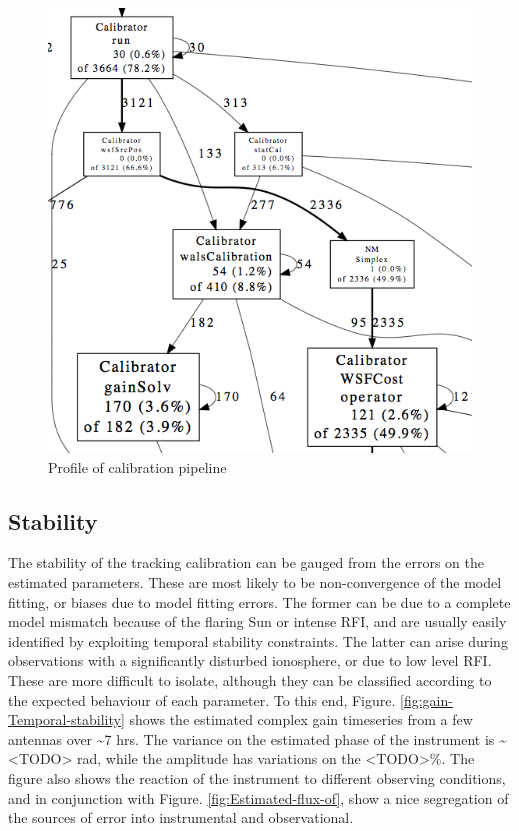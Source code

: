 \documentclass{aa}
\begin{document}
\begin{figure}[tbh]
\includegraphics[width=1\columnwidth]{Figs/pipeline_profile}\caption{\label{fig:Profile-of-calibration}Profile of calibration pipeline}


\end{figure}



\subsection{\label{sub:Stability}Stability}

The stability of the tracking calibration can be gauged from the errors
on the estimated parameters. These are most likely to be non-convergence
of the model fitting, or biases due to model fitting errors. The former
can be due to a complete model mismatch because of the flaring Sun
or intense RFI, and are usually easily identified by exploiting temporal
stability constraints. The latter can arise during observations with
a significantly disturbed ionosphere, or due to low level RFI. These
are more difficult to isolate, although they can be classified according
to the expected behaviour of each parameter. To this end, Figure.
\ref{fig:gain-Temporal-stability} shows the estimated complex gain
timeseries from a few antennas over \textasciitilde{}7 hrs. The variance
on the estimated phase of the instrument is \textasciitilde{}<TODO>
rad, while the amplitude has variations on the <TODO>\%. The figure
also shows the reaction of the instrument to different observing conditions,
and in conjunction with Figure. \ref{fig:Estimated-flux-of}, show
a nice segregation of the sources of error into instrumental and observational.
\end{document}
